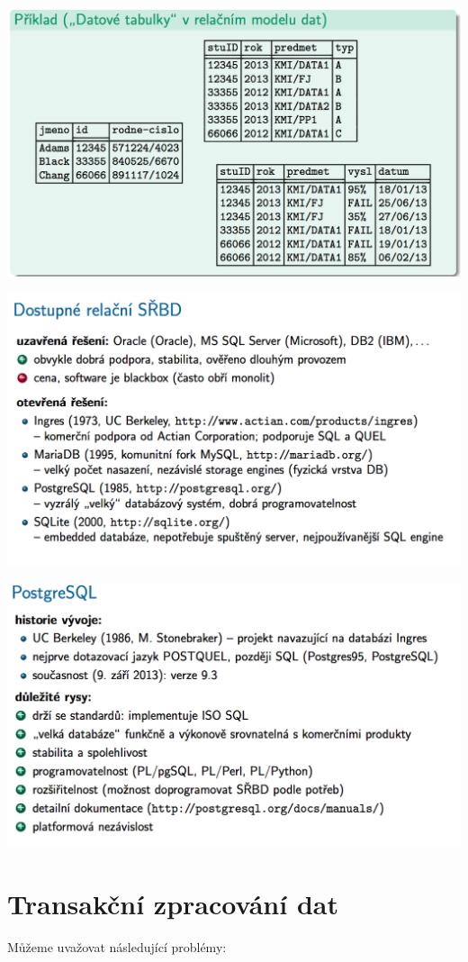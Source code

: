 \documentclass[10pt,a4paper]{article}
\begin{document}
\includegraphics[scale=0.4]{img/76}

\includegraphics[scale=0.4]{img/77}

\includegraphics[scale=0.4]{img/78}

\section{Transakční zpracování dat}
Můžeme uvažovat následující problémy:
\end{document}
